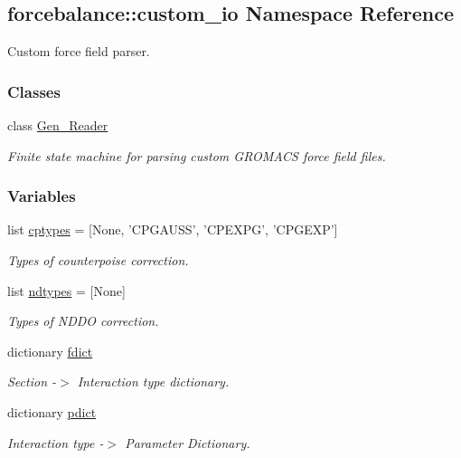 \hypertarget{namespaceforcebalance_1_1custom__io}{\subsection{forcebalance\-:\-:custom\-\_\-io \-Namespace \-Reference}
\label{namespaceforcebalance_1_1custom__io}
}


\-Custom force field parser.  


\subsubsection*{\-Classes}
\begin{DoxyCompactItemize}
\item 
class \hyperlink{classforcebalance_1_1custom__io_1_1Gen__Reader}{\-Gen\-\_\-\-Reader}
\begin{DoxyCompactList}\small\item\em \-Finite state machine for parsing custom \-G\-R\-O\-M\-A\-C\-S force field files. \end{DoxyCompactList}\end{DoxyCompactItemize}
\subsubsection*{\-Variables}
\begin{DoxyCompactItemize}
\item 
list \hyperlink{namespaceforcebalance_1_1custom__io_a509d4c2b5eeee4278adde414e55eb560}{cptypes} = \mbox{[}\-None, '\-C\-P\-G\-A\-U\-S\-S', '\-C\-P\-E\-X\-P\-G', '\-C\-P\-G\-E\-X\-P'\mbox{]}
\begin{DoxyCompactList}\small\item\em \-Types of counterpoise correction. \end{DoxyCompactList}\item 
list \hyperlink{namespaceforcebalance_1_1custom__io_a604fd5cd1f0c6057a8a72ac61b55f6fa}{ndtypes} = \mbox{[}\-None\mbox{]}
\begin{DoxyCompactList}\small\item\em \-Types of \-N\-D\-D\-O correction. \end{DoxyCompactList}\item 
dictionary \hyperlink{namespaceforcebalance_1_1custom__io_a64c7f292c64ad2b2b855a82e68c0ca7e}{fdict}
\begin{DoxyCompactList}\small\item\em \-Section -\/$>$ \-Interaction type dictionary. \end{DoxyCompactList}\item 
dictionary \hyperlink{namespaceforcebalance_1_1custom__io_aaa87b8099dee5dfec42f5869dabad0c5}{pdict}
\begin{DoxyCompactList}\small\item\em \-Interaction type -\/$>$ \-Parameter \-Dictionary. \end{DoxyCompactList}\end{DoxyCompactItemize}


